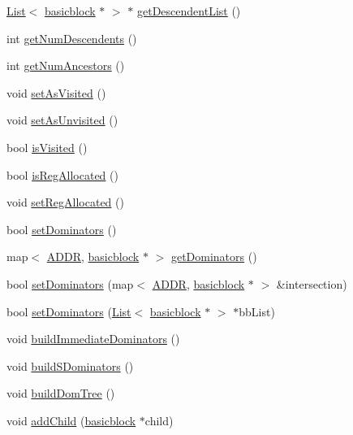 \begin{DoxyCompactItemize}
\item 
\hyperlink{classList}{List}$<$ \hyperlink{classbasicblock}{basicblock} $\ast$ $>$ $\ast$ \hyperlink{classbasicblock_afac9781fe5c67f0d3f983d60e468dc8d}{getDescendentList} ()
\item 
int \hyperlink{classbasicblock_a42700afdf9102a0f287690f4f8c487f9}{getNumDescendents} ()
\item 
int \hyperlink{classbasicblock_af95ff01c9b4eb7a12cd58558771c92b2}{getNumAncestors} ()
\item 
void \hyperlink{classbasicblock_adb3d7c691e7974f77619409fe4a24335}{setAsVisited} ()
\item 
void \hyperlink{classbasicblock_a810b34c12cbddff700700341734ddc5d}{setAsUnvisited} ()
\item 
bool \hyperlink{classbasicblock_ad40cc70b314779ab7d0990813d3053d4}{isVisited} ()
\item 
bool \hyperlink{classbasicblock_ac254c6b6e38f968418e9239f5eebcee2}{isRegAllocated} ()
\item 
void \hyperlink{classbasicblock_a58e5eb2ef1760113614b7d29007d5b56}{setRegAllocated} ()
\item 
bool \hyperlink{classbasicblock_aae21234b7ccd801b037a3a26a11d44e7}{setDominators} ()
\item 
map$<$ \hyperlink{binaryTranslator_2global_8h_a8bb6b77b3aab51e3a8d1866dd5861225}{ADDR}, \hyperlink{classbasicblock}{basicblock} $\ast$ $>$ \hyperlink{classbasicblock_aec14cf5254976daec791c62e1b684ecf}{getDominators} ()
\item 
bool \hyperlink{classbasicblock_a9e417b7d2b2cb87281b4c8ed1b10d566}{setDominators} (map$<$ \hyperlink{binaryTranslator_2global_8h_a8bb6b77b3aab51e3a8d1866dd5861225}{ADDR}, \hyperlink{classbasicblock}{basicblock} $\ast$ $>$ \&intersection)
\item 
bool \hyperlink{classbasicblock_aafd371f1d5701ae15546178a153ca23d}{setDominators} (\hyperlink{classList}{List}$<$ \hyperlink{classbasicblock}{basicblock} $\ast$ $>$ $\ast$bbList)
\item 
void \hyperlink{classbasicblock_a668baef0263404790b8b03e336b96dda}{buildImmediateDominators} ()
\item 
void \hyperlink{classbasicblock_ad88c3d7891025016b9de9f3bfb2b3ddb}{buildSDominators} ()
\item 
void \hyperlink{classbasicblock_a8e7863ba06ca7f2418f1f423e6f71e8a}{buildDomTree} ()
\item 
void \hyperlink{classbasicblock_abb47633a30d4722992c2d961a4a4ad14}{addChild} (\hyperlink{classbasicblock}{basicblock} $\ast$child)

\end{DoxyCompactItemize}
